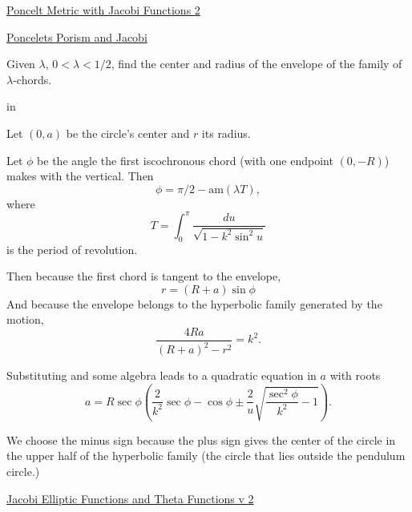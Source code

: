 \documentclass{ximera}
\newcommand{\pskip}{\vskip 0.1 in}
\begin{document}
\begin{onlineOnly}
    \begin{center}
\end{center}
\end{onlineOnly}

\href{https://www.desmos.com/calculator/hm5zop04ob}{Poncelt Metric with Jacobi Functions 2}



\begin{onlineOnly}
    \begin{center}
\end{center}
\end{onlineOnly}

\href{https://www.desmos.com/calculator/lwbypn9rje}{Poncelets Porism and Jacobi}



\begin{exploration}

Given $\lambda$, $0 < \lambda < 1/2$, find the center and radius of the envelope of the family of $\lambda$-chords. 

\pskip

Let $(0,a)$ be the circle's center and $r$ its radius.

Let $\phi$ be the angle the first iscochronous chord (with one endpoint $(0,-R)$) makes with the vertical. Then
\[
      \phi = \pi/2 - \text{am}(\lambda T) ,
\]
where
\[
  T = \int_0^{\pi} \frac{du}{\sqrt{1-k^2\sin^2 u}}
\] 
is the period of revolution.

Then because the first chord is tangent to the envelope,
\[
     r = (R+a) \sin \phi
\]
And because the envelope belongs to the hyperbolic family generated by the motion,
\[
  \frac{4Ra}{(R+a)^2 - r^2} = k^2 .
\]

Substituting and some algebra leads to a quadratic equation in $a$ with roots
\[
  a =   R \sec \phi \left( \frac{2}{k^2} \sec \phi - \cos\phi \pm   \frac{2}{u} \sqrt{\frac{\sec^2\phi}{k^2} - 1}   \right) .
\]

We choose the minus sign because the plus sign gives the center of the circle in the upper half of the hyperbolic family (the circle that lies outside the pendulum circle.)



\begin{onlineOnly}
    \begin{center}
\end{center}
\end{onlineOnly}

\href{https://www.desmos.com/calculator/svb8pwijet}{Jacobi Elliptic Functions and Theta Functions v 2}


\end{exploration}
\end{document}
